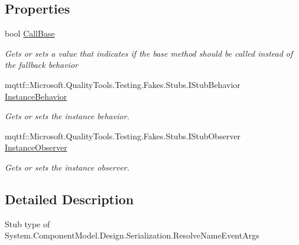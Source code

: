 \subsection*{Properties}
\begin{DoxyCompactItemize}
\item 
bool \hyperlink{class_system_1_1_component_model_1_1_design_1_1_serialization_1_1_fakes_1_1_stub_resolve_name_event_args_ab0e2fe97cb7e019c43f9f13bc23971a7}{Call\-Base}
\begin{DoxyCompactList}\small\item\em Gets or sets a value that indicates if the base method should be called instead of the fallback behavior\end{DoxyCompactList}\item 
mqttf\-::\-Microsoft.\-Quality\-Tools.\-Testing.\-Fakes.\-Stubs.\-I\-Stub\-Behavior \hyperlink{class_system_1_1_component_model_1_1_design_1_1_serialization_1_1_fakes_1_1_stub_resolve_name_event_args_a96335de86dcac049bd7fca8470d7021b}{Instance\-Behavior}
\begin{DoxyCompactList}\small\item\em Gets or sets the instance behavior.\end{DoxyCompactList}\item 
mqttf\-::\-Microsoft.\-Quality\-Tools.\-Testing.\-Fakes.\-Stubs.\-I\-Stub\-Observer \hyperlink{class_system_1_1_component_model_1_1_design_1_1_serialization_1_1_fakes_1_1_stub_resolve_name_event_args_a69fc4f0e5d8dfc9659f7faa8c5482690}{Instance\-Observer}
\begin{DoxyCompactList}\small\item\em Gets or sets the instance observer.\end{DoxyCompactList}\end{DoxyCompactItemize}


\subsection{Detailed Description}
Stub type of System.\-Component\-Model.\-Design.\-Serialization.\-Resolve\-Name\-Event\-Args



